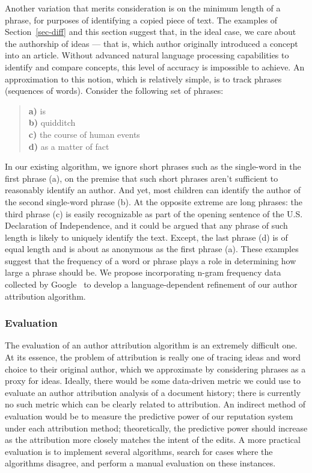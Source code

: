 Another variation that merits consideration is on the minimum
length of a phrase, for purposes of identifying a copied
piece of text.
The examples of Section~\ref{sec-diff} and this section
suggest that,
in the ideal case, we care about the authorship of ideas ---
that is, which author originally introduced a concept into an article.
Without advanced natural language processing capabilities
to identify and compare concepts,
this level of accuracy is impossible to achieve.
An approximation to this notion, which is relatively simple,
is to track phrases (sequences of words).
Consider the following set of phrases:
\begin{quote}
\textbf{a)} is \\[0.5ex]
\textbf{b)} quidditch \\[0.5ex]
\textbf{c)} the course of human events \\[0.5ex]
\textbf{d)} as a matter of fact
\end{quote}
In our existing algorithm, we ignore short phrases
such as the single-word in the first phrase (a), on the
premise that such short phrases aren't sufficient
to reasonably identify an author.
And yet, most children can identify the author
of the second single-word phrase (b).
At the opposite extreme are long phrases:
the third phrase (c) is easily recognizable as part of the
opening sentence of the U.S. Declaration of Independence,
and it could be argued that any phrase of such length is
likely to uniquely identify the text.
Except, the last phrase (d) is of equal length and is
about as anonymous as the first phrase (a).
These examples suggest that the
frequency of a word or phrase plays a role in
determining how large a phrase should be.
We propose incorporating n-gram frequency data
collected by Google~\cite{GoogleNGram2006} to
develop a language-dependent refinement of our
author attribution algorithm.

\subsubsection{Evaluation}
\label{sec-attribution-eval}

The evaluation of an author attribution algorithm
is an extremely difficult one.
At its essence, the problem of attribution is
really one of tracing ideas and word choice
to their original author,
which we approximate by considering
phrases as a proxy for ideas.
Ideally, there would be some data-driven metric
we could use to evaluate an author attribution
analysis of a document history; there is currently
no such metric which can be clearly related to attribution.
An indirect method of evaluation would be to measure
the predictive power of our reputation system under
each attribution method; theoretically, the predictive
power should increase as the attribution more closely
matches the intent of the edits.
A more practical evaluation is to implement several
algorithms, search for cases where the algorithms
disagree, and perform a manual evaluation on these
instances.

